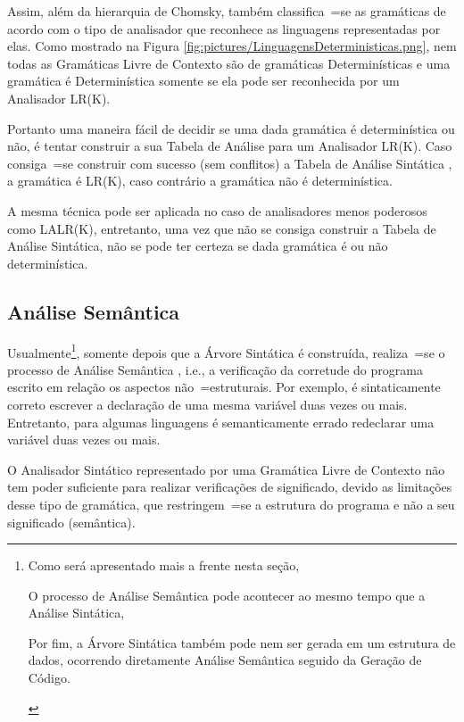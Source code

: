 {    Assim,
    além da hierarquia de Chomsky,
    também classifica~=se as gramáticas de acordo com o tipo de analisador que reconhece as linguagens representadas por elas.
    Como mostrado na Figura \ref{fig:pictures/LinguagensDeterministicas.png},
    nem todas as Gramáticas Livre de Contexto são de gramáticas Determinísticas e
    uma gramática é Determinística somente se ela pode ser reconhecida por um Analisador LR(K).

    Portanto uma maneira fácil de decidir se uma dada gramática é determinística ou
    não,
    é tentar construir a sua Tabela de Análise para um Analisador LR(K).
    Caso consiga~=se construir com sucesso (sem conflitos) a Tabela de Análise Sintática \cite{ahoCompilerDragonBook},
    a gramática é LR(K),
    caso contrário a gramática não é determinística.

    A mesma técnica pode ser aplicada no caso de analisadores menos poderosos como LALR(K),
    entretanto,
    uma vez que não se consiga construir a Tabela de Análise Sintática,
    não se pode ter certeza se dada gramática é ou não determinística.


\subsection{Análise Semântica}
\label{analiseSemantica}

    Usualmente\footnote{
    Como será apresentado mais a frente nesta seção,
    \begin{inparaenum}
    \item O processo de Análise Semântica pode acontecer ao mesmo tempo que a Análise Sintática,
    \item Por fim,
    a Árvore Sintática também pode nem ser gerada em um estrutura de dados,
    ocorrendo diretamente Análise Semântica seguido da Geração de Código.
    \end{inparaenum}
    },
    somente depois que a Árvore Sintática é construída,
    realiza~=se o processo de Análise Semântica \cite{ahoCompilerDragonBook},
    i.e.,
    a verificação da corretude do programa escrito em relação os aspectos não~=estruturais.
    Por exemplo,
    é sintaticamente correto escrever a declaração de uma mesma variável duas vezes ou
    mais. Entretanto,
    para algumas linguagens é semanticamente errado redeclarar uma variável duas vezes ou
    mais.

    O Analisador Sintático representado por uma Gramática Livre de Contexto não tem poder suficiente para realizar verificações de significado,
    devido as limitações desse tipo de gramática,
    que restringem~=se a estrutura do programa e
    não a seu significado (semântica).

}
